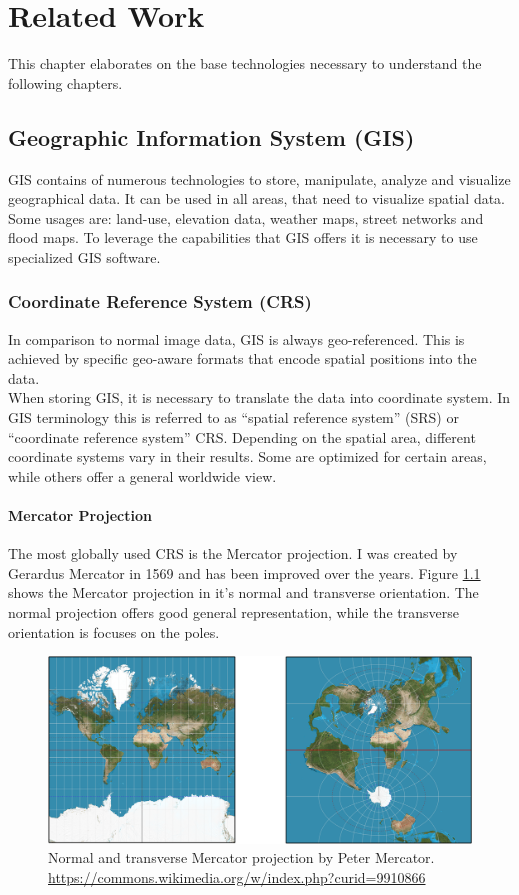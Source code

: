 
\chapter{Related Work}
This chapter elaborates on the base technologies necessary to understand the following chapters.



\section{Geographic Information System (GIS)}
GIS contains of numerous technologies to store, manipulate, analyze and visualize geographical data. It can be used in all areas, that need to visualize spatial data. Some usages are: land-use, elevation data, weather maps, street networks and flood maps. To leverage the capabilities that GIS offers it is necessary to use specialized GIS software.


\subsection{Coordinate Reference System (CRS)}
In comparison to normal image data, GIS is always geo-referenced. This is achieved by specific geo-aware formats that encode spatial positions into the data. \\
When storing GIS, it is necessary to translate the data into coordinate system. In GIS terminology this is referred to as \enquote{spatial reference system} (SRS) or \enquote{coordinate reference system} CRS. Depending on the spatial area, different coordinate systems vary in their results. Some are optimized for certain areas, while others offer a general worldwide view.

\subsubsection{Mercator Projection}
The most globally used CRS is the Mercator projection. I was created by Gerardus Mercator in 1569 and has been improved over the years. Figure \ref{fig:mercator} shows the Mercator projection in it's normal and transverse orientation. The normal projection offers good general representation, while the transverse orientation is focuses on the poles.
\begin{figure}[H]
	\centering\includegraphics[width=1\textwidth]{res/Mercator}
	\caption{Normal and transverse Mercator projection by Peter Mercator. \url{https://commons.wikimedia.org/w/index.php?curid=9910866}}
	\label{fig:mercator}
\end{figure}

